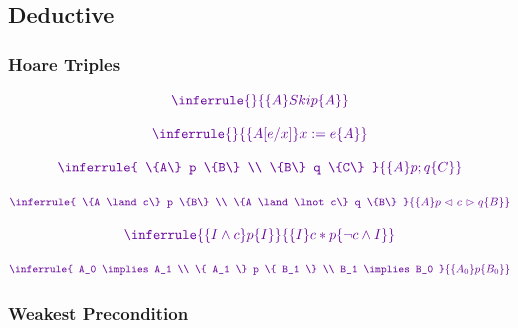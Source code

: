 \newpage
\subsection{Deductive}

\subsubsection{Hoare Triples}

\[\mcolour
\inferrule
 {  }
 { \{A\} Skip \{A\}}
\]

\[\mcolour
\inferrule
 {  }
 { \{A[e/x]\} x:= e \{A\}}
\]

\[\mcolour
\inferrule
 { \{A\} p \{B\} \\ \{B\} q \{C\} }
 { \{A\} p;q \{C\}}
\]

\[\mcolour
\inferrule
 { \{A \land c\} p \{B\}
   \\
   \{A \land \lnot c\} q \{B\} }
 { \{A\} p \cond c q \{B\}}
\]

\[\mcolour
\inferrule
 { \{ I \land c \} p \{ I \} }
 { \{I\} c * p \{\lnot c \land I\} }
\]

\[\mcolour
\inferrule
 { A_0 \implies A_1
   \\
   \{ A_1 \} p \{ B_1 \}
   \\
   B_1 \implies B_0
   }
 { \{A_0\} p \{B_0\}}
\]

\subsubsection{Weakest Precondition}

